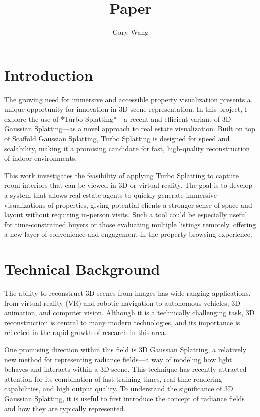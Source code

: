 \documentclass[10pt,twocolumn]{article}
\title{Paper}
\author{Gary Wang}
\affiliation{Occidental College}
\begin{document}
\maketitle


\section{Introduction}

The growing need for immersive and accessible property visualization presents a unique opportunity for innovation in 3D scene representation. In this project, I explore the use of *Turbo Splatting*—a recent and efficient variant of 3D Gaussian Splatting—as a novel approach to real estate visualization. Built on top of Scaffold Gaussian Splatting, Turbo Splatting is designed for speed and scalability, making it a promising candidate for fast, high-quality reconstruction of indoor environments.

This work investigates the feasibility of applying Turbo Splatting to capture room interiors that can be viewed in 3D or virtual reality. The goal is to develop a system that allows real estate agents to quickly generate immersive visualizations of properties, giving potential clients a stronger sense of space and layout without requiring in-person visits. Such a tool could be especially useful for time-constrained buyers or those evaluating multiple listings remotely, offering a new layer of convenience and engagement in the property browsing experience.


\section{Technical Background}

The ability to reconstruct 3D scenes from images has wide-ranging applications, from virtual reality (VR) and robotic navigation to autonomous vehicles, 3D animation, and computer vision. Although it is a technically challenging task, 3D reconstruction is central to many modern technologies, and its importance is reflected in the rapid growth of research in this area.

One promising direction within this field is 3D Gaussian Splatting, a relatively new method for representing radiance fields—a way of modeling how light behaves and interacts within a 3D scene. This technique has recently attracted attention for its combination of fast training times, real-time rendering capabilities, and high output quality. To understand the significance of 3D Gaussian Splatting, it is useful to first introduce the concept of radiance fields and how they are typically represented.
\end{document}
